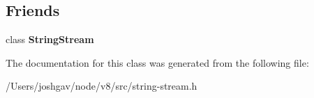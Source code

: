 \subsection*{Friends}
\begin{DoxyCompactItemize}
\item 
class {\bfseries String\+Stream}\hypertarget{classv8_1_1internal_1_1_fmt_elm_a1e02d3fa3aed0e038625842888f70c2a}{}\label{classv8_1_1internal_1_1_fmt_elm_a1e02d3fa3aed0e038625842888f70c2a}

\end{DoxyCompactItemize}


The documentation for this class was generated from the following file\+:\begin{DoxyCompactItemize}
\item 
/\+Users/joshgav/node/v8/src/string-\/stream.\+h\end{DoxyCompactItemize}
